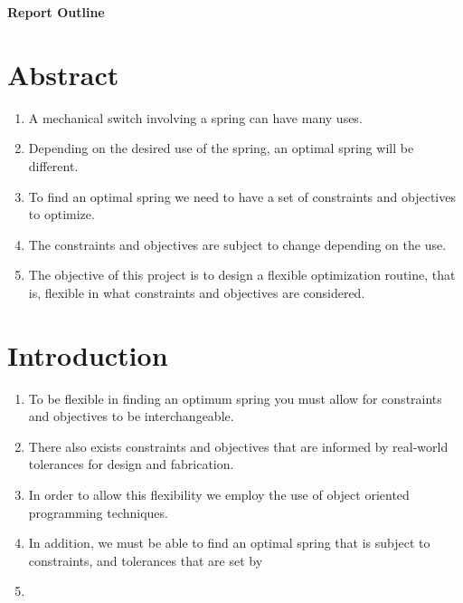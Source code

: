 \documentclass[11pt]{article}
\begin{document}
\begin{center}{\Large{\textbf{Report Outline}}}
\end{center}


\vspace{.2in}

\section{Abstract}

	\begin{enumerate}
		\item A mechanical switch involving a spring can have many uses. 
		
		\item Depending on the desired use of the spring, an optimal spring will be different. 
	
		\item To find an optimal spring we need to have a set of constraints and objectives to optimize. 
		
		\item The constraints and objectives are subject to change depending on the use. 
		
		\item The objective of this project is to design a flexible optimization routine, that is, flexible in what constraints and objectives are considered. 
		
	\end{enumerate}
	
\section{Introduction}
	\begin{enumerate}

		\item To be flexible in finding an optimum spring you must allow for constraints and objectives to be interchangeable.
				
		\item There also exists constraints and objectives that are informed by real-world tolerances for design and fabrication. 
	
		\item In order to allow this flexibility we employ the use of object oriented programming techniques. 
		
		\item In addition, we must be able to find an optimal spring that is subject to constraints, and tolerances that are set by 
		
		\item 
		
	\end{enumerate}
	
\end{document}
